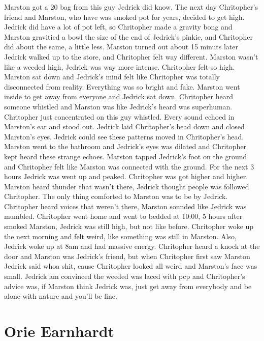 \documentclass[12pt]{book}
\begin{document}
Marston got a 20 bag from this guy Jedrick did know. The next day Chritopher's friend and Marston, who have was smoked pot for years, decided to get high. Jedrick did have a lot of pot left, so Chritopher made a gravity bong and Marston gravitied a bowl the size of the end of Jedrick's pinkie, and Chritopher did about the same, a little less. Marston turned out about 15 minuts later Jedrick walked up to the store, and Chritopher felt way different. Marston wasn't like a weeded high, Jedrick was way more intense. Chritopher felt so high. Marston sat down and Jedrick's mind felt like Chritopher was totally disconnected from reality. Everything was so bright and fake. Marston went inside to get away from everyone and Jedrick sat down. Chritopher heard someone whistled and Marston was like Jedrick's heard was superhuman. Chritopher just concentrated on this guy whistled. Every sound echoed in Marston's ear and stood out. Jedrick laid Chritopher's head down and closed Marston's eyes. Jedrick could see these patterns moved in Chritopher's head. Marston went to the bathroom and Jedrick's eyes was dilated and Chritopher kept heard these strange echoes. Marston tapped Jedrick's foot on the ground and Chritopher felt like Marston was connected with the ground. For the next 3 hours Jedrick was went up and peaked. Chritopher was got higher and higher. Marston heard thunder that wasn't there, Jedrick thought people was followed Chritopher. The only thing comforted to Marston was to be by Jedrick. Chritopher heard voices that weren't there, Marston sounded like Jedrick was mumbled. Chritopher went home and went to bedded at 10:00, 5 hours after smoked Marston, Jedrick was still high, but not like before. Chritopher woke up the next morning and felt weird, like something was still in Marston. Also, Jedrick woke up at 8am and had massive energy. Chritopher heard a knock at the door and Marston was Jedrick's friend, but when Chritopher first saw Marston Jedrick said whoa shit, cause Chritopher looked all weird and Marston's face was small. Jedrick am convinced the weeded was laced with pcp and Chritopher's advice was, if Marston think Jedrick was, just get away from everybody and be alone with nature and you'll be fine.



\chapter{Orie Earnhardt}
\end{document}
